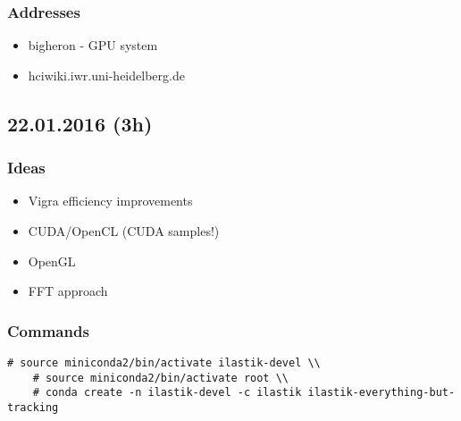 \documentclass[12pt,a4paper]{article}
\begin{document}
  \subsubsection{Addresses}
    \begin{itemize}
      \item bigheron - GPU system
      \item hciwiki.iwr.uni-heidelberg.de
    \end{itemize}


\subsection{22.01.2016 (3h)}

  \subsubsection{Ideas}
    \begin{itemize}
      \item Vigra efficiency improvements
      \item CUDA/OpenCL (CUDA samples!)
      \item OpenGL
      \item FFT approach
    \end{itemize}

  \subsubsection{Commands}

    \begin{lstlisting}[style=BashInputStyle]
    # source miniconda2/bin/activate ilastik-devel \\
    # source miniconda2/bin/activate root \\
    # conda create -n ilastik-devel -c ilastik ilastik-everything-but-tracking
    \end{lstlisting}
\end{document}

